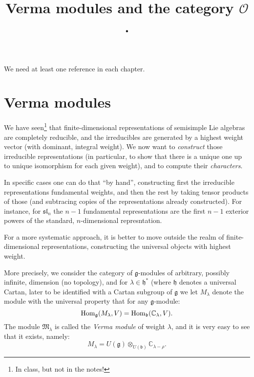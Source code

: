 

%


\title{Verma modules and the category $\mathcal O$.}


\maketitle

\label{section-phantom}


\tableofcontents

We need at least one reference \cite{reference} in each chapter.



\section{Verma modules}
We have seen\footnote{In class, but not in the notes!} that finite-dimensional representations of semisimple Lie algebras are completely reducible, and the irreducibles are generated by a highest weight vector (with dominant, integral weight). We now want to \emph{construct} those irreducible representations (in particular, to show that there is a unique one up to unique isomorphism for each given weight), and to compute their \emph{characters}.

In specific cases one can do that ``by hand'', constructing first the irreducible representations fundamental weights, and then the rest by taking tensor products of those (and subtracing copies of the representations already constructed). For instance, for $\mathfrak{sl}_n$ the $n-1$ fundamental representations are the first $n-1$ exterior powers of the standard, $n$-dimensional represntation.

For a more systematic approach, it is better to move outside the realm of finite-dimensional representations, constructing the universal objects with highest weight.

More precisely, we consider the category of $\mathfrak g$-modules of arbitrary, possibly infinite, dimension (no topology), and for $\lambda\in \mathfrak h^*$ (where $\mathfrak h$ denotes a universal Cartan, later to be identified with a Cartan subgroup of $\mathfrak g$ we let $M_\lambda$ denote the module with the universal property that for any $\mathfrak g$-module:
$$\mathop{\rm Hom}\nolimits_{\mathfrak g}(M_\lambda, V) = \mathop{\rm Hom}\nolimits_{\mathfrak b} (\mathbb C_\lambda,V).$$
The module $\mathfrak M_\lambda$ is called the \emph{Verma module} of weight $\lambda$, and it is very easy to see that it exists, namely:
$$M_\lambda = U(\mathfrak g)\otimes_{U(\mathfrak b)} \mathbb C_{\lambda-\rho}.$$

